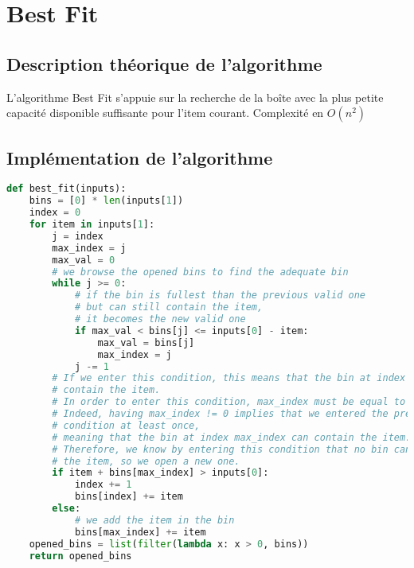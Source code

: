 \documentclass{article}
\begin{document}


\section{Best Fit}
\subsection{Description théorique de l'algorithme}
L'algorithme Best Fit s'appuie sur la recherche de la boîte avec la plus petite capacité disponible suffisante pour l'item courant.
Complexité en $O(n^2)$

\subsection{Implémentation de l'algorithme}
\begin{lstlisting}[language=Python, frame=single]
def best_fit(inputs):
    bins = [0] * len(inputs[1])
    index = 0
    for item in inputs[1]:
        j = index
        max_index = j
        max_val = 0
        # we browse the opened bins to find the adequate bin
        while j >= 0:
            # if the bin is fullest than the previous valid one
            # but can still contain the item,
            # it becomes the new valid one
            if max_val < bins[j] <= inputs[0] - item:
                max_val = bins[j]
                max_index = j
            j -= 1
        # If we enter this condition, this means that the bin at index max_index cannot
        # contain the item.
        # In order to enter this condition, max_index must be equal to 0.
        # Indeed, having max_index != 0 implies that we entered the precedent if
        # condition at least once,
        # meaning that the bin at index max_index can contain the item.
        # Therefore, we know by entering this condition that no bin can contain
        # the item, so we open a new one.
        if item + bins[max_index] > inputs[0]:
            index += 1
            bins[index] += item
        else:
            # we add the item in the bin
            bins[max_index] += item
    opened_bins = list(filter(lambda x: x > 0, bins))
    return opened_bins
\end{lstlisting}
\end{document}
